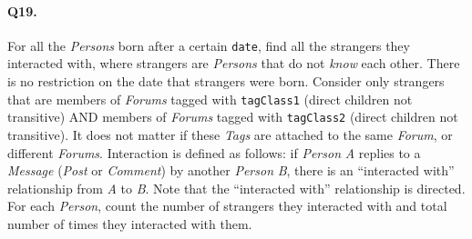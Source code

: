 \paragraph{Q19.}
For all the \emph{Persons} born after a certain \texttt{date}, find all
the strangers they interacted with, where strangers are \emph{Persons}
that do not \emph{know} each other. There is no restriction on the date
that strangers were born.
Consider only strangers that are members of \emph{Forums} tagged with
\texttt{tagClass1} (direct children not transitive) AND members of
\emph{Forums} tagged with \texttt{tagClass2} (direct children not
transitive). It does not matter if these \emph{Tags} are attached to the
same \emph{Forum}, or different \emph{Forums}.
Interaction is defined as follows: if \emph{Person} \emph{A} replies to
a \emph{Message} (\emph{Post} or \emph{Comment}) by another
\emph{Person} \emph{B}, there is an ``interacted with'' relationship
from \emph{A} to \emph{B}. Note that the ``interacted with''
relationship is directed.
For each \emph{Person}, count the number of strangers they interacted
with and total number of times they interacted with them.
